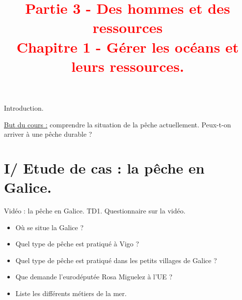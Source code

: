 \documentclass{beamer}
\title{{\textcolor{red}{Partie 3 - Des hommes et des ressources \\ Chapitre 1 - Gérer les océans et leurs ressources.}}}
\begin{document}
\begin{frame}
 \titlepage %
 \end{frame}
 
 \begin{frame}
 \tableofcontents
 \end{frame}
 
 \begin{frame} Introduction.
 
\underline{ But du cours :} comprendre la situation de la pêche actuellement. Peux-t-on arriver à une pêche durable ?
 \end{frame}
 
 \section{I/ Etude de cas : la pêche en Galice.}

\begin{frame} Vidéo : la pêche en Galice.
TD1. Questionnaire sur la vidéo.
\end{frame}
 
 \begin{frame}
  \begin{itemize}
  \item Où se situe la Galice ? %
  \item Quel type de pêche est pratiqué à Vigo ?%
  \item Quel type de pêche est pratiqué dans les petits villages de Galice ? %
   \item Que demande l'eurodéputée Rosa Miguelez à l'UE ? %
  \item Liste les différents métiers de la mer. %
  \end{itemize}
 \end{frame}
 
\end{document}
